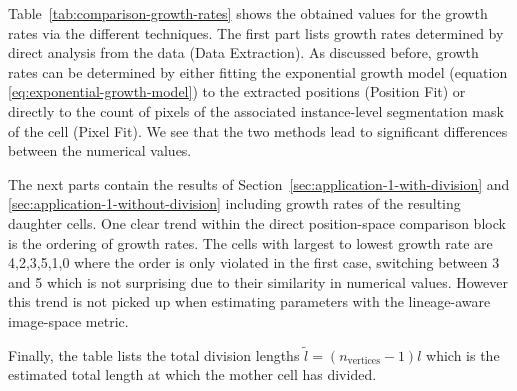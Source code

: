 Table~\ref{tab:comparison-growth-rates} shows the obtained values for the growth rates via the
different techniques.
The first part lists growth rates determined by direct analysis from the data (Data Extraction).
As discussed before, growth rates can be determined by either fitting the exponential growth model
(equation \ref{eq:exponential-growth-model}) to the extracted positions (Position Fit) or directly
to the count of pixels of the associated instance-level segmentation mask of the cell (Pixel Fit).
We see that the two methods lead to significant differences between the numerical values.

The next parts contain the results of Section~\ref{sec:application-1-with-division} and
\ref{sec:application-1-without-division} including growth rates of the resulting daughter cells.
One clear trend within the direct position-space comparison block is the ordering of growth rates.
The cells with largest to lowest growth rate are 4,2,3,5,1,0 where the order is only violated in
the first case, switching between 3 and 5 which is not surprising due to their similarity in
numerical values.
However this trend is not picked up when estimating parameters with the lineage-aware image-space
metric.

Finally, the table lists the total division lengths $\tilde{l}=(n_\text{vertices}-1)l$ which is the
estimated total length at which the mother cell has divided.

